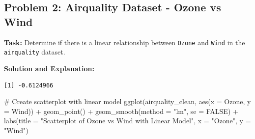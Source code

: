 \documentclass[
  letterpaper,
  DIV=11,
  numbers=noendperiod]{scrreprt}
\newenvironment{Shaded}{\begin{snugshade}}{\end{snugshade}}
\newcommand{\AttributeTok}[1]{\textcolor[rgb]{0.40,0.45,0.13}{#1}}
\newcommand{\CommentTok}[1]{\textcolor[rgb]{0.37,0.37,0.37}{#1}}
\newcommand{\ConstantTok}[1]{\textcolor[rgb]{0.56,0.35,0.01}{#1}}
\newcommand{\FunctionTok}[1]{\textcolor[rgb]{0.28,0.35,0.67}{#1}}
\newcommand{\NormalTok}[1]{\textcolor[rgb]{0.00,0.23,0.31}{#1}}
\newcommand{\OtherTok}[1]{\textcolor[rgb]{0.00,0.23,0.31}{#1}}
\newcommand{\SpecialCharTok}[1]{\textcolor[rgb]{0.37,0.37,0.37}{#1}}
\newcommand{\StringTok}[1]{\textcolor[rgb]{0.13,0.47,0.30}{#1}}
\begin{document}
\subsection*{Problem 2: Airquality Dataset - Ozone vs
Wind}\label{problem-2-airquality-dataset---ozone-vs-wind-1}

\textbf{Task:} Determine if there is a linear relationship between
\texttt{Ozone} and \texttt{Wind} in the \texttt{airquality} dataset.

\textbf{Solution and Explanation:}

\begin{Shaded}
\end{Shaded}

\begin{verbatim}
[1] -0.6124966
\end{verbatim}

\begin{Shaded}
\begin{Highlighting}[]
\CommentTok{\# Create scatterplot with linear model}
\FunctionTok{ggplot}\NormalTok{(airquality\_clean, }\FunctionTok{aes}\NormalTok{(}\AttributeTok{x =}\NormalTok{ Ozone, }\AttributeTok{y =}\NormalTok{ Wind)) }\SpecialCharTok{+}
  \FunctionTok{geom\_point}\NormalTok{() }\SpecialCharTok{+}
  \FunctionTok{geom\_smooth}\NormalTok{(}\AttributeTok{method =} \StringTok{"lm"}\NormalTok{, }\AttributeTok{se =} \ConstantTok{FALSE}\NormalTok{) }\SpecialCharTok{+}
  \FunctionTok{labs}\NormalTok{(}\AttributeTok{title =} \StringTok{"Scatterplot of Ozone vs Wind with Linear Model"}\NormalTok{, }\AttributeTok{x =} \StringTok{"Ozone"}\NormalTok{, }\AttributeTok{y =} \StringTok{"Wind"}\NormalTok{)}
\end{Highlighting}
\end{Shaded}
\end{document}
